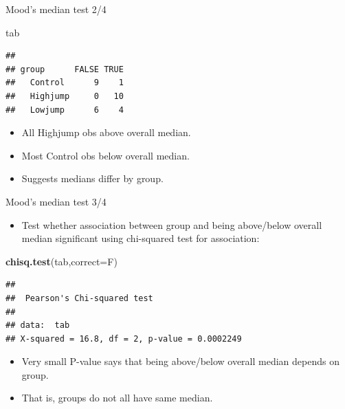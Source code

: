 \documentclass[
  ignorenonframetext,
]{beamer}
\newenvironment{Shaded}{\begin{snugshade}}{\end{snugshade}}
\newcommand{\DataTypeTok}[1]{\textcolor[rgb]{0.13,0.29,0.53}{#1}}
\newcommand{\KeywordTok}[1]{\textcolor[rgb]{0.13,0.29,0.53}{\textbf{#1}}}
\newcommand{\NormalTok}[1]{#1}
\providecommand{\tightlist}{%
  \setlength{\itemsep}{0pt}\setlength{\parskip}{0pt}}
\begin{document}
\begin{frame}[fragile]{Mood's median test 2/4}
\protect\hypertarget{moods-median-test-24}{}

\begin{Shaded}
\begin{Highlighting}[]
\NormalTok{tab}
\end{Highlighting}
\end{Shaded}

\begin{verbatim}
##           
## group      FALSE TRUE
##   Control      9    1
##   Highjump     0   10
##   Lowjump      6    4
\end{verbatim}

\begin{itemize}
\tightlist
\item
  All Highjump obs above overall median.
\item
  Most Control obs below overall median.
\item
  Suggests medians differ by group.
\end{itemize}

\end{frame}

\begin{frame}[fragile]{Mood's median test 3/4}
\protect\hypertarget{moods-median-test-34}{}

\begin{itemize}
\tightlist
\item
  Test whether association between group and being above/below overall
  median significant using chi-squared test for association:
\end{itemize}

\begin{Shaded}
\begin{Highlighting}[]
\KeywordTok{chisq.test}\NormalTok{(tab,}\DataTypeTok{correct=}\NormalTok{F)}
\end{Highlighting}
\end{Shaded}

\begin{verbatim}
## 
##  Pearson's Chi-squared test
## 
## data:  tab
## X-squared = 16.8, df = 2, p-value = 0.0002249
\end{verbatim}

\begin{itemize}
\tightlist
\item
  Very small P-value says that being above/below overall median depends
  on group.
\item
  That is, groups do not all have same median.
\end{itemize}

\end{frame}
\end{document}
